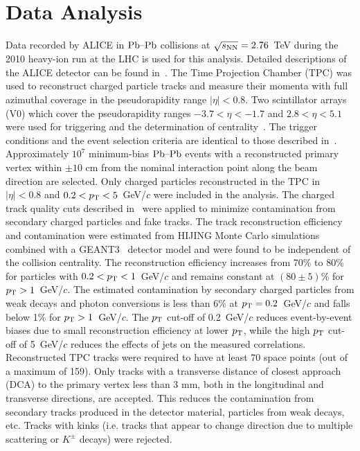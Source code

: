 \section{Data Analysis}
\label{sec:experiment}
Data recorded by ALICE in $\textnormal{Pb--Pb}$ collisions at $\sqrt{s_{\textnormal{NN}}}=2.76$~TeV during the 2010 heavy-ion run at the
LHC is used for this analysis. Detailed descriptions of the ALICE
detector can be found
in~\cite{Aamodt:2008zz,Carminati:2004fp,Alessandro:2006yt}. The Time
Projection Chamber (TPC) was used to reconstruct charged particle
tracks and measure their momenta with full azimuthal coverage in the
pseudorapidity range $|\eta|<0.8$. Two scintillator
arrays (V0) which cover the pseudorapidity  ranges $-3.7<\eta<-1.7$
and $2.8<\eta<5.1$ were used for triggering and the determination of
centrality~\cite{Aamodt:2010cz}. The trigger
conditions and the event selection criteria are identical to those
described in~\cite{Aamodt:2010pa, Aamodt:2010cz}.
Approximately $10^7$ minimum-bias $\textnormal{Pb--Pb}$ events with
a reconstructed primary vertex within $\pm 10$ cm from the nominal
interaction point along the beam direction are selected. Only charged particles reconstructed in the TPC in $|\eta|<0.8$
and $0.2<p_{\rm T}<5$~GeV/$c$ were included in the analysis. The charged track quality cuts
described in~\cite{Aamodt:2010pa} were applied to minimize
contamination from secondary charged particles and fake tracks.
The track reconstruction efficiency and contamination
were estimated from HIJING Monte Carlo
simulations~\cite{Wang:1991hta} combined with a GEANT3~\cite{Brun:1994aa} detector model and were found to be independent of
the collision centrality. The reconstruction efficiency increases from
70\% to 80\% for particles with $0.2<p_{\rm T}<1$~GeV/$c$ and remains
constant at $(80 \pm 5)$\% for $p_{\rm T}>1$~GeV/$c$. The estimated
contamination by secondary charged particles from weak decays and
photon conversions is less than 6\% at $p_{\rm T}=0.2$~GeV/$c$ and falls
below 1\% for $p_{\rm T}>1$~GeV/$c$.
The $p_{\rm T}$ cut-off of 0.2~GeV/$c$ reduces event-by-event biases due to small reconstruction efficiency 
at lower $p_{\rm T}$, while the high $p_{\rm T}$ cut-off of 5~GeV/$c$ reduces the effects of jets on the measured correlations. 
Reconstructed TPC tracks were required to have at least 70 space points (out of a maximum of 159). 
Only tracks with a transverse distance of closest approach (DCA) to the primary vertex less than 3 mm, both in the longitudinal and transverse directions, are accepted. This reduces the contamination from secondary tracks produced in the detector material, particles from weak decays, etc. Tracks with kinks (i.e. tracks that appear to change direction due to multiple scattering or $K^{\pm}$ decays) were rejected.



